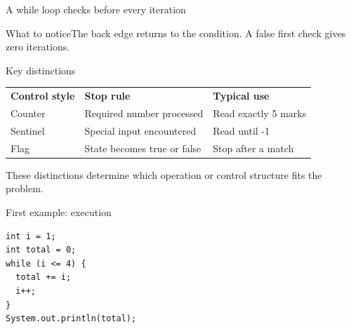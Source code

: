 \documentclass[10pt,aspectratio=169]{beamer}
\begin{document}
\begin{frame}[fragile,t]{A while loop checks before every iteration}
\begin{center}\end{center}
\begin{block}{What to notice}The back edge returns to the condition. A false first check gives zero iterations.\end{block}
\end{frame}
\begin{frame}[fragile,t]{Key distinctions}
\small\renewcommand{\arraystretch}{1.5}
\begin{tabularx}{\textwidth}{>{\raggedright\arraybackslash}X>{\raggedright\arraybackslash}X>{\raggedright\arraybackslash}X}
\rowcolor{navy}
\color{white}\bfseries Control style & \color{white}\bfseries Stop rule & \color{white}\bfseries Typical use\\
Counter & Required number processed & Read exactly 5 marks\\
Sentinel & Special input encountered & Read until -1\\
Flag & State becomes true or false & Stop after a match\\
\end{tabularx}
\vspace{3mm}\footnotesize These distinctions determine which operation or control structure fits the problem.
\end{frame}

\begin{frame}[fragile,t]{First example: execution}
\begin{lstlisting}
int i = 1;
int total = 0;
while (i <= 4) {
  total += i;
  i++;
}
System.out.println(total);
\end{lstlisting}
\end{frame}
\end{document}
